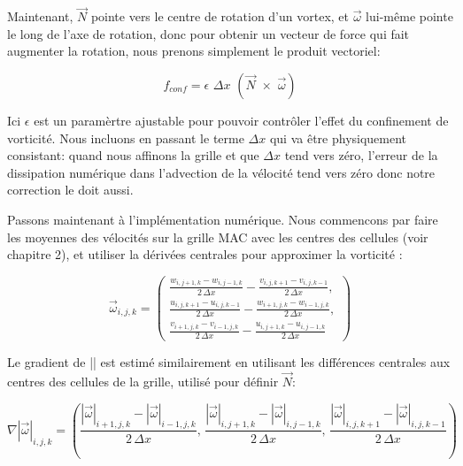 \documentclass[11pt]{report}
\begin{document}
Maintenant, $\overrightarrow{N}$ pointe vers le centre de rotation d'un vortex, et $\overrightarrow{\omega}$ lui-même pointe le long de l'axe de rotation, donc pour obtenir un vecteur de force qui fait augmenter la rotation, nous prenons simplement le produit vectoriel:

\begin{equation}
f_{conf} = \epsilon \,\, \Delta x \,\, (\overrightarrow{N} \,\, \times \,\, \overrightarrow{\omega})
\end{equation}

Ici $\epsilon$ est un paramèrtre ajustable pour pouvoir contrôler l'effet du confinement de vorticité. Nous incluons en passant le terme $\Delta x$ qui va être physiquement consistant: quand nous affinons la grille et que $\Delta x$ tend vers zéro, l'erreur de la dissipation numérique dans l'advection de la vélocité tend vers zéro donc notre correction le doit aussi.\newline

Passons maintenant à l'implémentation numérique. Nous commencons par faire les moyennes des vélocités sur la grille MAC avec les centres des cellules (voir chapitre 2), et utiliser la dérivées centrales pour approximer la vorticité :

\begin{equation}
\overrightarrow{\omega}_{i,j,k} = 
	\left(
		\begin{array}{c}
			\frac{w_{i,j+1,k} - w_{i,j-1,k}}{2\,\Delta x} - \frac{v_{i,j,k+1} - v_{i,j,k-1}}{2\,\Delta x}, \\
			\frac{u_{i,j,k+1} - u_{i,j,k-1}}{2\,\Delta x} - \frac{w_{i+1,j,k} - w_{i-1,j,k}}{2\,\Delta x}, \\
	 		\frac{v_{i+1,j,k} - v_{i-1,j,k}}{2\,\Delta x} - \frac{u_{i,j+1,k} - u_{i,j-1,k}}{2\,\Delta x}
		\end{array}
	\right)
\end{equation}

Le gradient de |\overrightarrow{\omega}| est estimé similairement en utilisant les différences centrales aux centres des cellules de la grille, utilisé pour définir $\overrightarrow{N}$:

\begin{equation}
\nabla |\overrightarrow{\omega}| _{i,j,k} = 
	\left(
		\frac{|\overrightarrow{\omega}|_{i+1,j,k} - |\overrightarrow{\omega}|_{i-1,j,k} }{2 \,\Delta x},\,
		\frac{|\overrightarrow{\omega}|_{i,j+1,k} - |\overrightarrow{\omega}|_{i,j-1,k} }{2 \,\Delta x},\,
		\frac{|\overrightarrow{\omega}|_{i,j,k+1} - |\overrightarrow{\omega}|_{i,j,k-1} }{2 \,\Delta x}
 	\right)
\end{equation}
\end{document}
